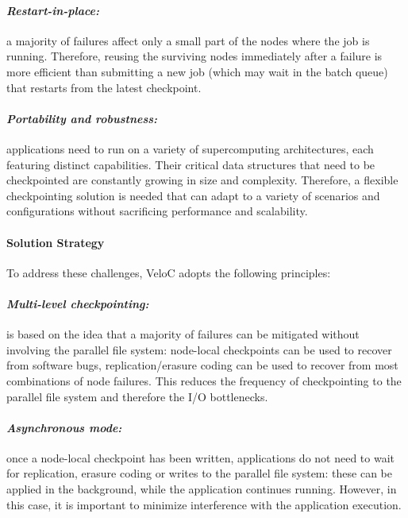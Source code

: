 \paragraph{\emph{Restart-in-place:}} a majority of failures affect
only a small part of the nodes where the job is running. Therefore,
reusing the surviving nodes immediately after a failure is more
efficient than submitting a new job (which may wait in the batch
queue) that restarts from the latest checkpoint.
\vspace{-1em}

\paragraph{\emph{Portability and robustness:}} applications need to
run on a variety of supercomputing architectures, each featuring
distinct capabilities. Their critical data structures that need to be
checkpointed are constantly growing in size and complexity. Therefore,
a flexible checkpointing solution is needed that can adapt to a
variety of scenarios and configurations without sacrificing
performance and scalability.

\paragraph{Solution Strategy}

To address these challenges, VeloC adopts the following principles:
\vspace{-1em}

\paragraph{\emph{Multi-level checkpointing:}} is based on the idea
that a majority of failures can be mitigated without involving the
parallel file system: node-local checkpoints can be used to recover
from software bugs, replication/erasure coding can be used to recover
from most combinations of node failures. This reduces the frequency of
checkpointing to the parallel file system and therefore the I/O
bottlenecks.
\vspace{-1em}

\paragraph{\emph{Asynchronous mode:}} once a node-local checkpoint has
been written, applications do not need to wait for replication,
erasure coding or writes to the parallel file system: these can be
applied in the background, while the application continues
running. However, in this case, it is important to minimize
interference with the application execution.
\vspace{-1em}

